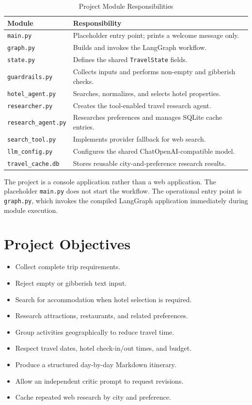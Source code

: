 \documentclass[12pt,a4paper]{report}
\begin{document}
\begin{table}[htbp]
\centering
\caption{Project Module Responsibilities}
\label{tab:project-modules}
\begin{tabularx}{\textwidth}{|>{\raggedright\arraybackslash}p{3.5cm}|X|}
\hline
\textbf{Module} & \textbf{Responsibility} \\
\hline
\texttt{main.py} & Placeholder entry point; prints a welcome message only. \\
\hline
\texttt{graph.py} & Builds and invokes the LangGraph workflow. \\
\hline
\texttt{state.py} & Defines the shared \texttt{TravelState} fields. \\
\hline
\texttt{guardrails.py} & Collects inputs and performs non-empty and gibberish checks. \\
\hline
\texttt{hotel\_agent.py} & Searches, normalizes, and selects hotel properties. \\
\hline
\texttt{researcher.py} & Creates the tool-enabled travel research agent. \\
\hline
\texttt{research\_agent.py} & Researches preferences and manages SQLite cache entries. \\
\hline
\texttt{search\_tool.py} & Implements provider fallback for web search. \\
\hline
\texttt{llm\_config.py} & Configures the shared ChatOpenAI-compatible model. \\
\hline
\texttt{travel\_cache.db} & Stores reusable city-and-preference research results. \\
\hline
\end{tabularx}
\end{table}

The project is a console application rather than a web application. The placeholder
\texttt{main.py} does not start the workflow. The operational entry point is \texttt{graph.py},
which invokes the compiled LangGraph application immediately during module execution.

\section{Project Objectives}
\label{sec:project-objectives}
\begin{itemize}
    \item Collect complete trip requirements.
    \item Reject empty or gibberish text input.
    \item Search for accommodation when hotel selection is required.
    \item Research attractions, restaurants, and related preferences.
    \item Group activities geographically to reduce travel time.
    \item Respect travel dates, hotel check-in/out times, and budget.
    \item Produce a structured day-by-day Markdown itinerary.
    \item Allow an independent critic prompt to request revisions.
    \item Cache repeated web research by city and preference.
\end{itemize}
\end{document}
